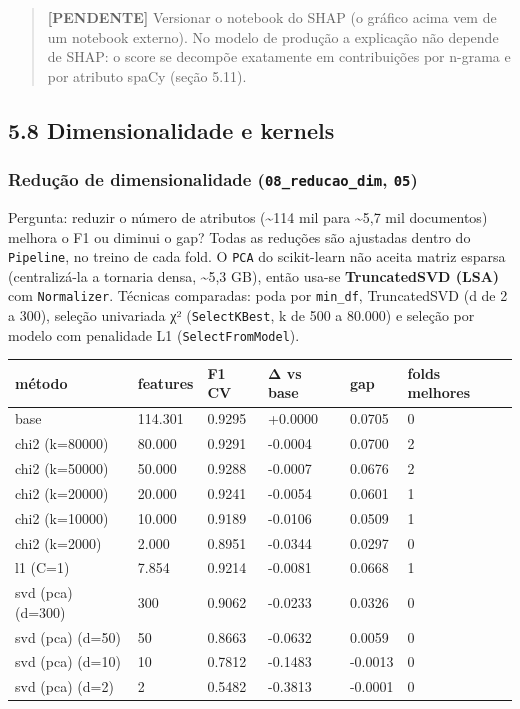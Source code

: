 \documentclass[
  brazilian,
  11pt,
]{article}
\newcounter{none} %
\begin{document}
\begin{quote}
\textbf{{[}PENDENTE{]}} Versionar o notebook do SHAP (o gráfico acima vem de um notebook externo). No modelo de produção a explicação não depende de SHAP: o score se decompõe exatamente em contribuições por n-grama e por atributo spaCy (seção 5.11).
\end{quote}

\subsection{5.8 Dimensionalidade e kernels}\label{dimensionalidade-e-kernels}

\subsubsection{\texorpdfstring{Redução de dimensionalidade (\texttt{08\_reducao\_dim}, \texttt{05})}{Redução de dimensionalidade (08\_reducao\_dim, 05)}}\label{reduuxe7uxe3o-de-dimensionalidade-08_reducao_dim-05}

Pergunta: reduzir o número de atributos (\textasciitilde114 mil para \textasciitilde5,7 mil documentos) melhora o F1 ou diminui o gap? Todas as reduções são ajustadas dentro do \texttt{Pipeline}, no treino de cada fold. O \texttt{PCA} do scikit-learn não aceita matriz esparsa (centralizá-la a tornaria densa, \textasciitilde5,3 GB), então usa-se \textbf{TruncatedSVD (LSA)} com \texttt{Normalizer}. Técnicas comparadas: poda por \texttt{min\_df}, TruncatedSVD (d de 2 a 300), seleção univariada χ² (\texttt{SelectKBest}, k de 500 a 80.000) e seleção por modelo com penalidade L1 (\texttt{SelectFromModel}).

{\def\LTcaptype{none} %
\begin{longtable}[]{@{}llllll@{}}
\toprule\noalign{}
método & features & F1 CV & Δ vs base & gap & folds melhores \\
\midrule\noalign{}
\endhead
\bottomrule\noalign{}
\endlastfoot
base & 114.301 & 0.9295 & +0.0000 & 0.0705 & 0 \\
chi2 (k=80000) & 80.000 & 0.9291 & -0.0004 & 0.0700 & 2 \\
chi2 (k=50000) & 50.000 & 0.9288 & -0.0007 & 0.0676 & 2 \\
chi2 (k=20000) & 20.000 & 0.9241 & -0.0054 & 0.0601 & 1 \\
chi2 (k=10000) & 10.000 & 0.9189 & -0.0106 & 0.0509 & 1 \\
chi2 (k=2000) & 2.000 & 0.8951 & -0.0344 & 0.0297 & 0 \\
l1 (C=1) & 7.854 & 0.9214 & -0.0081 & 0.0668 & 1 \\
svd (pca) (d=300) & 300 & 0.9062 & -0.0233 & 0.0326 & 0 \\
svd (pca) (d=50) & 50 & 0.8663 & -0.0632 & 0.0059 & 0 \\
svd (pca) (d=10) & 10 & 0.7812 & -0.1483 & -0.0013 & 0 \\
svd (pca) (d=2) & 2 & 0.5482 & -0.3813 & -0.0001 & 0 \\
\end{longtable}
}
\end{document}
